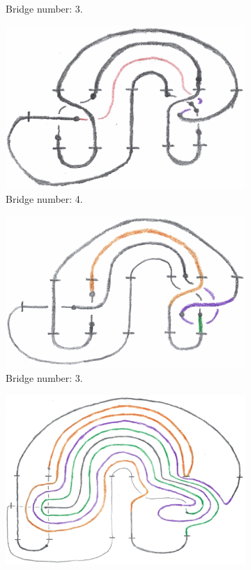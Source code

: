 \documentclass[titlepage]{article}
\numberwithin{figure}{section}
\numberwithin{table}{section}
\numberwithin{equation}{section}
\begin{document}
\begin{itemize}
\begin{itemize}
\begin{figure}[h!]
\begin{subfigure}[b]{0.3\linewidth}
                \caption{Bridge number: 3.}
                \label{fig:ex3-11-2b}
            \end{subfigure}
            \begin{subfigure}[b]{0.3\linewidth}
                \centering
                \includegraphics[width=0.8\linewidth]{Blender/ex3-11-2c.png}
                \caption{Bridge number: 4.}
                \label{fig:ex3-11-2c}
            \end{subfigure}
            \par\bigskip
            \begin{subfigure}[b]{0.3\linewidth}
                \centering
                \includegraphics[width=0.8\linewidth]{Blender/ex3-11-2d.png}
                \caption{Bridge number: 3.}
                \label{fig:ex3-11-2d}
            \end{subfigure}
            \begin{subfigure}[b]{0.6\linewidth}
                \centering
                \includegraphics[width=0.8\linewidth]{Blender/ex3-11-2e.png}

\end{subfigure}
\end{figure}
\end{itemize}
\end{itemize}
\end{document}
